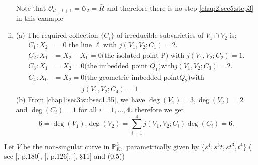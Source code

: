 \begin{example}
\begin{enumerate}[(i)]
  Note that $\mathscr{O}_{d-t+1} = \mathscr{O}_2 = \bar{R}$ and
  therefore there is no step \ref{chap2:sec5:step3} in this example 
\item (a) The required collection $\{ C_i\}$ of irreducible
  subvarieties of $V_1 \cap V_2$ is:   
  \begin{align*}
    C_1:  X_2 & = 0 \text{ the line } \ell \text{ with } j (V_1, V_2
    ;C_1) = 2.\\ 
    C_2:  X_1 & =X_2-X_0 = 0 \text{(the isolated point P) with } j
    (V_1, V_2 ;C_2) = 1.\\ 
    C_3:  X_1 & = X_2 = 0\text{(the imbedded point }Q_1) \text{
      with} j (V_1, V_2 ;C_3) = 2.\\ 
    C_4:  X_0 & = X_2 =0  \text{(the geometric imbedded point} Q_2)
    \text{with}\\ 
    & \qquad \qquad j (V_1, V_2 ;C_4) = 1.
  \end{align*}\pageoriginale  
  (b) From \ref{chap1:sec3:subsec1.35}, we have $\deg (V_1) = 3, \deg
  (V_2) = 2$ and $\deg 
  (C_i) = 1$ for all $i = 1,\ldots,4$.  therefore we get  
  $$
  6 = \deg (V_1).\deg (V_2) = \sum_{i=1}^4 j (V_1, V_2 ;C_i) \deg (C_i) = 6.
  $$
\end{enumerate}
\end{example}

\setcounter{example}{2}
 \begin{example}\label{chap3:sec1:exp3.3}%
  Let $V$ be the non-singular curve in $\mathbb{P}^3_K,$
  parametrically given by $\{ s^4, s^3t, st^3,t^4\}$ ( see
  [\cite{26}, p.180], [\cite{50}, p.126]; [\cite{90}, \S 11] and (0.5)) 
\end{example}


